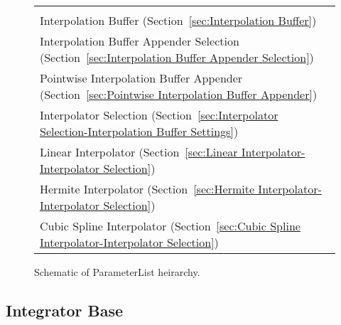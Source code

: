 \begin{figure}
\begin{tabular}{p{}}
    \index{Trailing Interpolation Buffer Selection} \\ 
\hspace*{0.6in} Interpolation Buffer (Section~\ref{sec:Interpolation Buffer})
    \index{Interpolation Buffer} \\ 
\hspace*{0.4in} Interpolation Buffer Appender Selection (Section~\ref{sec:Interpolation Buffer Appender Selection})
    \index{Interpolation Buffer Appender Selection} \\ 
\hspace*{0.6in} Pointwise Interpolation Buffer Appender (Section~\ref{sec:Pointwise Interpolation Buffer Appender})
    \index{Pointwise Interpolation Buffer Appender} \\ 
\hspace*{0.4in} Interpolator Selection (Section~\ref{sec:Interpolator Selection-Interpolation Buffer Settings})
    \index{Interpolator Selection} \\ 
\hspace*{0.6in} Linear Interpolator (Section~\ref{sec:Linear Interpolator-Interpolator Selection})
    \index{Linear Interpolator} \\ 
\hspace*{0.6in} Hermite Interpolator (Section~\ref{sec:Hermite Interpolator-Interpolator Selection})
    \index{Hermite Interpolator} \\ 
\hspace*{0.6in} Cubic Spline Interpolator (Section~\ref{sec:Cubic Spline Interpolator-Interpolator Selection})
    \index{Cubic Spline Interpolator} \\ 
  \end{tabular}
\caption{Schematic of ParameterList heirarchy.} 
\label{fig:ParameterList-schematic} 
\end{figure} 
\newpage 

\subsection{Integrator Base}
\label{sec:Integrator Base}

